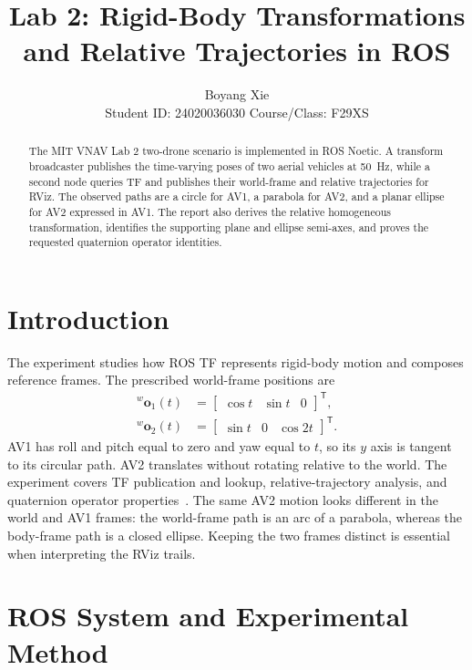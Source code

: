 \documentclass[letterpaper,10pt,conference]{ieeeconf}
\title{\LARGE \bf
Lab 2: Rigid-Body Transformations and Relative Trajectories in ROS
}
\author{Boyang Xie\\
Student ID: 24020036030 \quad Course/Class: F29XS}
\newcommand{\T}{\mathsf{T}}
\begin{document}
\maketitle
\thispagestyle{empty}
\pagestyle{empty}

\begin{abstract}
The MIT VNAV Lab 2 two-drone scenario is implemented in ROS Noetic. A transform broadcaster publishes the time-varying poses of two aerial vehicles at 50~Hz, while a second node queries TF and publishes their world-frame and relative trajectories for RViz. The observed paths are a circle for AV1, a parabola for AV2, and a planar ellipse for AV2 expressed in AV1. The report also derives the relative homogeneous transformation, identifies the supporting plane and ellipse semi-axes, and proves the requested quaternion operator identities.
\end{abstract}

\section{Introduction}
The experiment studies how ROS TF represents rigid-body motion and composes reference frames. The prescribed world-frame positions are
\begin{align}
{}^{w}\mathbf{o}_{1}(t)&=
\begin{bmatrix}\cos t&\sin t&0\end{bmatrix}^{\T},\nonumber\\
{}^{w}\mathbf{o}_{2}(t)&=
\begin{bmatrix}\sin t&0&\cos 2t\end{bmatrix}^{\T}.
\label{eq:world_positions}
\end{align}
AV1 has roll and pitch equal to zero and yaw equal to $t$, so its $y$ axis is tangent to its circular path. AV2 translates without rotating relative to the world. The experiment covers TF publication and lookup, relative-trajectory analysis, and quaternion operator properties~\cite{mitlab}.
The same AV2 motion looks different in the world and AV1 frames: the world-frame path is an arc of a parabola, whereas the body-frame path is a closed ellipse. Keeping the two frames distinct is essential when interpreting the RViz trails.

\section{ROS System and Experimental Method}
\end{document}
